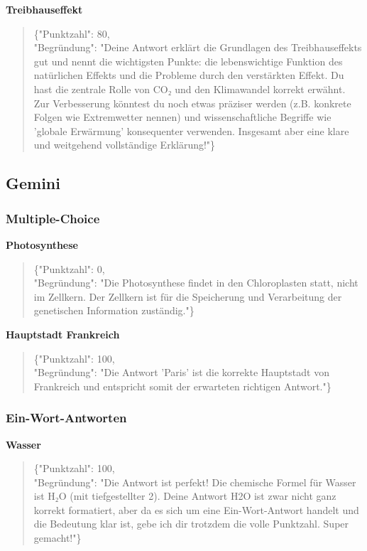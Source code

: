 \documentclass[a4paper,12pt]{article}
\begin{document}
\textbf{Treibhauseffekt}
\begin{quote}
\{"Punktzahl": 80,\\
"Begründung": "Deine Antwort erklärt die Grundlagen des Treibhauseffekts gut und nennt die wichtigsten Punkte: die lebenswichtige Funktion des natürlichen Effekts und die Probleme durch den verstärkten Effekt. Du hast die zentrale Rolle von CO₂ und den Klimawandel korrekt erwähnt. Zur Verbesserung könntest du noch etwas präziser werden (z.B. konkrete Folgen wie Extremwetter nennen) und wissenschaftliche Begriffe wie 'globale Erwärmung' konsequenter verwenden. Insgesamt aber eine klare und weitgehend vollständige Erklärung!"\}
\end{quote}

\subsection{Gemini}

\subsubsection{Multiple-Choice}

\textbf{Photosynthese}
\begin{quote}
\{"Punktzahl": 0,\\
"Begründung": "Die Photosynthese findet in den Chloroplasten statt, nicht im Zellkern. Der Zellkern ist für die Speicherung und Verarbeitung der genetischen Information zuständig."\}
\end{quote}

\textbf{Hauptstadt Frankreich}
\begin{quote}
\{"Punktzahl": 100,\\
"Begründung": "Die Antwort 'Paris' ist die korrekte Hauptstadt von Frankreich und entspricht somit der erwarteten richtigen Antwort."\}
\end{quote}

\subsubsection{Ein-Wort-Antworten}

\textbf{Wasser}
\begin{quote}
\{"Punktzahl": 100,\\
"Begründung": "Die Antwort ist perfekt! Die chemische Formel für Wasser ist H₂O (mit tiefgestellter 2). Deine Antwort H2O ist zwar nicht ganz korrekt formatiert, aber da es sich um eine Ein-Wort-Antwort handelt und die Bedeutung klar ist, gebe ich dir trotzdem die volle Punktzahl. Super gemacht!"\}
\end{quote}
\end{document}
